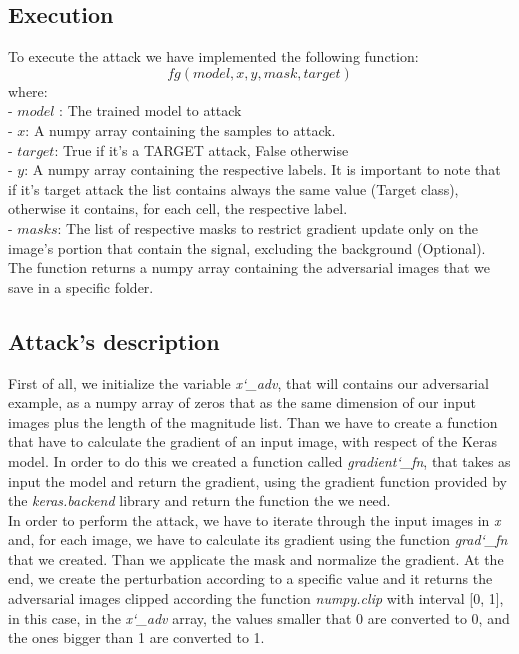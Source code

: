 \subsection{Execution}
To execute the attack we have implemented the following function:
\newline
\[ fg(model, x, y, mask, target)\]
where:\\
- $model$ : The trained model to attack\\
- $x$: A numpy array containing the samples to attack.\\
- $target$: True if it's a TARGET attack, False otherwise\\
- $y$: A numpy array containing the respective labels. It is important to note that if it's target attack the list contains always the same value (Target class), otherwise it contains, for each cell, the respective label. \\
- $masks$: The list of respective masks to restrict gradient update only on the image’s portion that contain the signal, excluding the background (Optional).\\
\newline
The function returns a numpy array containing the adversarial images that we save in a specific folder.

\subsection{Attack's description}
First of all, we initialize the variable \textit{x\char`_adv}, that will contains our adversarial example, as a numpy array of zeros that as the same dimension of our input images plus the length of the magnitude list. Than we have to create a function that have to calculate the gradient of an input image, with respect of the Keras model. In order to do this we created a function called \textit{gradient\char`_fn}, that takes as input the model and return the gradient, using the gradient function provided by the \textit{keras.backend} library and return the function the we need.\\
\newline
In order to perform the attack, we have to iterate through the input images in \textit{x} and, for each image, we have to calculate its gradient using the function \textit{grad\char`_fn} that we created. Than we applicate the mask and normalize the gradient.
\newline
At the end, we create the perturbation according to a specific value and it returns the adversarial images clipped according the function \textit{numpy.clip} with interval [0, 1], in this case, in the \textit{x\char`_adv} array, the values smaller that 0 are converted to 0, and the ones bigger than 1 are converted to 1.



